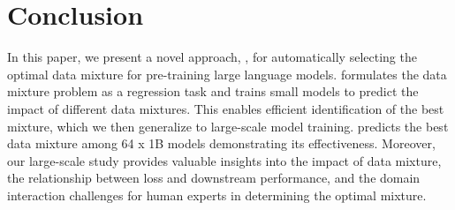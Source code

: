 \section{Conclusion}

In this paper, we present a novel approach, \ourmethod, for automatically selecting the optimal data mixture for pre-training large language models. \ourmethod formulates the data mixture problem as a regression task and trains small models to predict the impact of different data mixtures. This enables efficient identification of the best mixture, which we then generalize to large-scale model training. \ourmethod predicts the best data mixture among 64 x 1B models demonstrating its effectiveness. Moreover, our large-scale study provides valuable insights into the impact of data mixture, the relationship between loss and downstream performance, and the domain interaction challenges for human experts in determining the optimal mixture.

